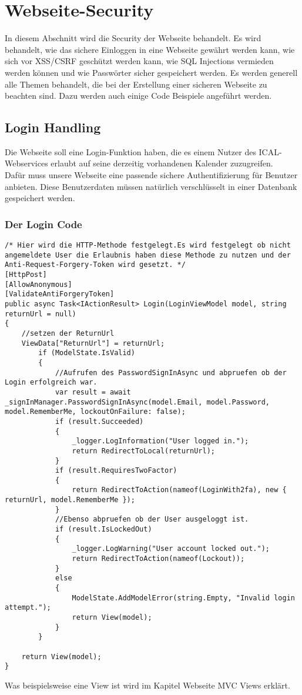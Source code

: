 \renewcommand{\theauthor}{Marcel Stering}
\chapter{Webseite-Security}
\label{sec:Security}
In diesem Abschnitt wird die Security der Webseite behandelt.
Es wird behandelt, wie das sichere Einloggen in eine Webseite gewährt werden kann, wie sich vor XSS/CSRF geschützt werden kann, wie SQL Injections vermieden werden können und wie Passwörter sicher gespeichert werden. Es werden generell alle Themen behandelt, die bei der Erstellung einer sicheren Webseite zu beachten sind. Dazu werden auch einige Code Beispiele angeführt werden.
\section{Login Handling}
\label{sec:Login}
Die Webseite soll eine Login-Funktion haben, die es einem Nutzer des ICAL-Webservices erlaubt auf seine derzeitig vorhandenen Kalender zuzugreifen.\\Dafür muss unsere Webseite eine passende sichere Authentifizierung für Benutzer anbieten. Diese Benutzerdaten müssen natürlich verschlüsselt in einer Datenbank gespeichert werden. 
\subsection{Der Login Code}
\label{sec:Login_Handling_Code}
\begin{lstlisting}
/* Hier wird die HTTP-Methode festgelegt.Es wird festgelegt ob nicht angemeldete User die Erlaubnis haben diese Methode zu nutzen und der Anti-Request-Forgery-Token wird gesetzt. */
[HttpPost]
[AllowAnonymous]
[ValidateAntiForgeryToken]
public async Task<IActionResult> Login(LoginViewModel model, string returnUrl = null)
{
	//setzen der ReturnUrl
    ViewData["ReturnUrl"] = returnUrl;
        if (ModelState.IsValid)
        {
        	//Aufrufen des PasswordSignInAsync und abpruefen ob der Login erfolgreich war.
            var result = await _signInManager.PasswordSignInAsync(model.Email, model.Password, model.RememberMe, lockoutOnFailure: false);
            if (result.Succeeded)
            {
                _logger.LogInformation("User logged in.");
                return RedirectToLocal(returnUrl);
            }
            if (result.RequiresTwoFactor)
            {
                return RedirectToAction(nameof(LoginWith2fa), new { returnUrl, model.RememberMe });
            }
            //Ebenso abpruefen ob der User ausgeloggt ist.
            if (result.IsLockedOut)
            {
                _logger.LogWarning("User account locked out.");
                return RedirectToAction(nameof(Lockout));
            }
            else
            {
                ModelState.AddModelError(string.Empty, "Invalid login attempt.");
                return View(model);
            }
        }

    return View(model);
}
\end{lstlisting}
Was beispielsweise eine View ist wird im Kapitel Webseite MVC Views erklärt. 
